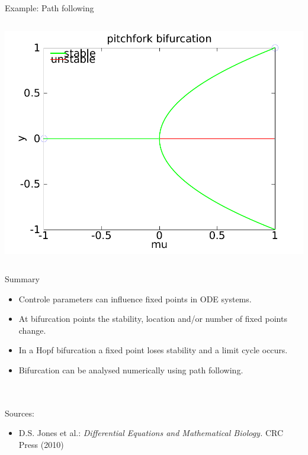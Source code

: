 \documentclass{beamer}
\begin{document}
\begin{frame}{Example: Path following}
\begin{columns}
        \pause
        
        \includegraphics[width=1\textwidth]{grafik/pfexample2}
        
    \end{columns}
\end{frame}

\begin{frame}{Summary}
    \begin{itemize}
        \item Controle parameters can influence fixed points in ODE systems.
        \item At bifurcation points the stability, location and/or number of fixed points change. 
        \item In a Hopf bifurcation a fixed point loses stability and a limit cycle occurs.
        \item Bifurcation can be analysed numerically using path following.
    \end{itemize}

~\\
~\\
    \small
    Sources:
    \begin{itemize}
        \small \item D.S. Jones et al.: \emph{Differential Equations and Mathematical Biology.} CRC Press (2010)
    \end{itemize}

\end{frame}
\end{document}

